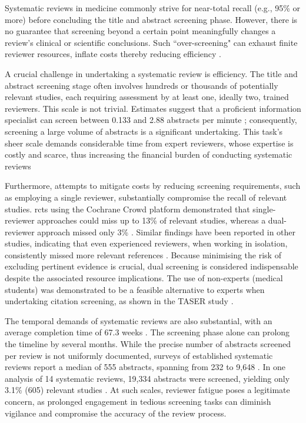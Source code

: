 \documentclass[10pt,oneside]{book}
\begin{document}
Systematic reviews in medicine commonly strive for near-total recall (e.g., 95\% or more) before concluding the title and abstract screening phase. However, there is no guarantee that screening beyond a certain point meaningfully changes a review's clinical or scientific conclusions. Such ``over-screening" can exhaust finite reviewer resources, inflate costs 
thereby reducing efficiency \cite{prabha_what_2007, ilani_analysis_2024}. 

A crucial challenge in undertaking a systematic review is efficiency. The title and abstract screening stage often involves hundreds or thousands of potentially relevant studies, each requiring assessment by at least one, ideally two, trained reviewers. This scale is not trivial. Estimates suggest that a proficient information specialist can screen between 0.133 and 2.88 abstracts per minute \cite{shemilt_use_2016,giummarra_evaluation_2020,felizardo_visual_2013}; consequently, screening a large volume of abstracts is a significant undertaking. This task's sheer scale demands considerable time from expert reviewers, whose expertise is costly and scarce, thus increasing the financial burden of conducting systematic reviews

Furthermore, attempts to mitigate costs by reducing screening requirements, such as employing a single reviewer, substantially compromise the recall of relevant studies. \glspl*{rct} using the Cochrane Crowd platform demonstrated that single-reviewer approaches could miss up to 13\% of relevant studies, whereas a dual-reviewer approach missed only 3\% \cite{gartlehner_single-reviewer_2020}. Similar findings have been reported in other studies, indicating that even experienced reviewers, when working in isolation, consistently missed more relevant references \cite{waffenschmidt_single_2019}. Because minimising the risk of excluding pertinent evidence is crucial, dual screening is considered indispensable despite the associated resource implications. The use of non-experts (medical students) was demonstrated to be a feasible alternative to experts when undertaking citation screening, as shown in the TASER study \cite{ng_title_2014}.

The temporal demands of systematic reviews are also substantial, with an average completion time of 67.3 weeks \cite{borah_analysis_2017}. The screening phase alone can prolong the timeline by several months. While the precise number of abstracts screened per review is not uniformly documented, surveys of established systematic reviews report a median of 555 abstracts, spanning from 232 to 9,648 \cite{nama_successful_2021}. In one analysis of 14 systematic reviews, 19,334 abstracts were screened, yielding only 3.1\% (605) relevant studies \cite{nama_successful_2021}. At such scales, reviewer fatigue poses a legitimate concern, as prolonged engagement in tedious screening tasks can diminish vigilance and compromise the accuracy of the review process.
\end{document}
